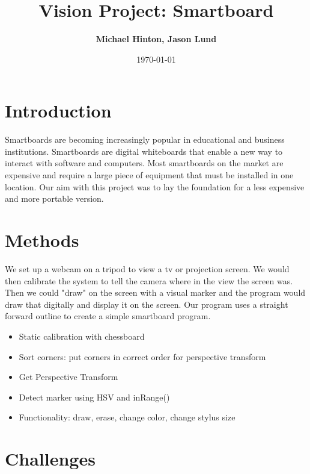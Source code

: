 \documentclass[letterpaper,10pt,oneside,onecolumn, titlepage]{article}
\title{Vision Project: Smartboard}
\author{\Large\textbf{Michael Hinton, Jason Lund}}
\date{\Large{\today}}
\begin{document}
\maketitle


\section{Introduction}
Smartboards are becoming increasingly popular in educational and business institutions.  Smartboards are digital whiteboards that enable a new way to interact with software and computers.  Most smartboards on the market are expensive and require a large piece of equipment that must be installed in one location.  Our aim with this project was to lay the foundation for a less expensive and more portable version.

\section{Methods}
We set up a webcam on a tripod to view a tv or projection screen.  We would then calibrate the system to tell the camera where in the view the screen was.  Then we could "draw" on the screen with a visual marker and the program would draw that digitally and display it on the screen.  Our program uses a straight forward outline to create a simple smartboard program.
\begin{itemize}
    \item Static calibration with chessboard
    \item Sort corners: put corners in correct order for perspective transform
    \item Get Perspective Transform
    \item Detect marker using HSV and inRange()
    \item Functionality: draw, erase, change color, change stylus size
\end{itemize}

\section{Challenges}
\end{document}
